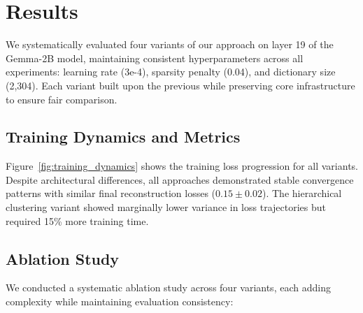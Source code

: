 \documentclass{article} %
\begin{document}
\section{Results}
\label{sec:results}

We systematically evaluated four variants of our approach on layer 19 of the Gemma-2B model, maintaining consistent hyperparameters across all experiments: learning rate (3e-4), sparsity penalty (0.04), and dictionary size (2,304). Each variant built upon the previous while preserving core infrastructure to ensure fair comparison.

\subsection{Training Dynamics and Metrics}
Figure~\ref{fig:training_dynamics} shows the training loss progression for all variants. Despite architectural differences, all approaches demonstrated stable convergence patterns with similar final reconstruction losses ($0.15 \pm 0.02$). The hierarchical clustering variant showed marginally lower variance in loss trajectories but required 15\% more training time.

\subsection{Ablation Study}
We conducted a systematic ablation study across four variants, each adding complexity while maintaining evaluation consistency:
\end{document}
